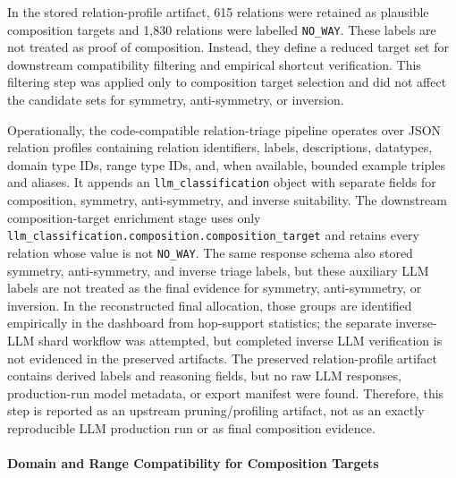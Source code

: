 \documentclass[12pt,a4paper]{article}
\begin{document}
In the stored relation-profile artifact, 615 relations were retained as plausible composition targets and 1{,}830 relations were labelled \texttt{NO\_WAY}. These labels are not treated as proof of composition. Instead, they define a reduced target set for downstream compatibility filtering and empirical shortcut verification. This filtering step was applied only to composition target selection and did not affect the candidate sets for symmetry, anti-symmetry, or inversion.

Operationally, the code-compatible relation-triage pipeline operates over JSON relation profiles containing relation identifiers, labels, descriptions, datatypes, domain type IDs, range type IDs, and, when available, bounded example triples and aliases. It appends an \texttt{llm\_classification} object with separate fields for composition, symmetry, anti-symmetry, and inverse suitability. The downstream composition-target enrichment stage uses only \texttt{llm\_classification.composition.composition\_target} and retains every relation whose value is not \texttt{NO\_WAY}. The same response schema also stored symmetry, anti-symmetry, and inverse triage labels, but these auxiliary LLM labels are not treated as the final evidence for symmetry, anti-symmetry, or inversion. In the reconstructed final allocation, those groups are identified empirically in the dashboard from hop-support statistics; the separate inverse-LLM shard workflow was attempted, but completed inverse LLM verification is not evidenced in the preserved artifacts. The preserved relation-profile artifact contains derived labels and reasoning fields, but no raw LLM responses, production-run model metadata, or export manifest were found. Therefore, this step is reported as an upstream pruning/profiling artifact, not as an exactly reproducible LLM production run or as final composition evidence.

\paragraph{Domain and Range Compatibility for Composition Targets}
\end{document}

